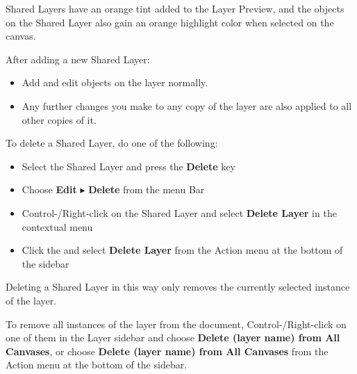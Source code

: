 \documentclass[../main.tex]{subfiles}
\begin{document}
\begin{ogpro}
  Shared Layers have an orange tint added to the Layer Preview, and the objects on the Shared
  Layer also gain an orange highlight color when selected on the canvas.

  After adding a new Shared Layer:

  \begin{itemize}
    \item Add and edit objects on the layer normally.
    \item Any further changes you make to any copy of the layer are also applied to all other
      copies of it.
  \end{itemize}

  To delete a Shared Layer, do one of the following:

  \begin{itemize}
    \item Select the Shared Layer and press the \textbf{Delete} key
    \item Choose \textbf{Edit} $\blacktriangleright$ \textbf{Delete} from the menu Bar
    \item Control-/Right-click on the Shared Layer and select \textbf{Delete Layer} in the
      contextual menu
    \item Click the  and select \textbf{Delete
      Layer} from the Action menu at the bottom of the sidebar
  \end{itemize}

  Deleting a Shared Layer in this way only removes the currently selected instance of the layer.

  To remove all instances of the layer from the document, Control-/Right-click on one of them in
  the Layer sidebar and choose \textbf{Delete (layer name) from All Canvases}, or choose
  \textbf{Delete (layer name) from All Canvases} from the Action menu at the bottom of the
  sidebar.
\end{ogpro}
\end{document}
